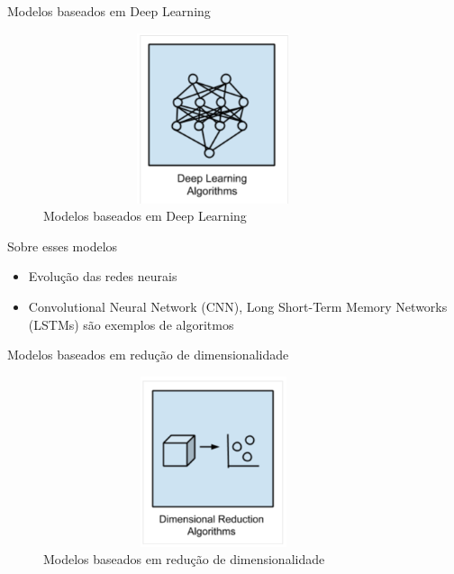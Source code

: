 \begin{frame}	
	\begin{block}{Modelos baseados em Deep Learning}	
		\begin{figure}[!htb]
			\centering	  				
			\includegraphics[height=5cm, width = 10cm]{./pic/deepLearning.png}
			\caption{Modelos baseados em Deep Learning}
			\label{fig_modelos}
		\end{figure}
	\end{block}
\end{frame}


\begin{frame}	
	\begin{block}{Sobre esses modelos}	
		\begin{itemize}
			\item Evolução das redes neurais
			\item Convolutional Neural Network (CNN), Long Short-Term Memory Networks (LSTMs) são exemplos de algoritmos 
		\end{itemize}
	\end{block}
\end{frame}


\begin{frame}	
	\begin{block}{Modelos baseados em redução de dimensionalidade}	
		\begin{figure}[!htb]
			\centering	  				
			\includegraphics[height=5cm, width = 10cm]{./pic/reducao.png}
			\caption{Modelos baseados em redução de dimensionalidade}
			\label{fig_modelos}
		\end{figure}
	\end{block}
\end{frame}


